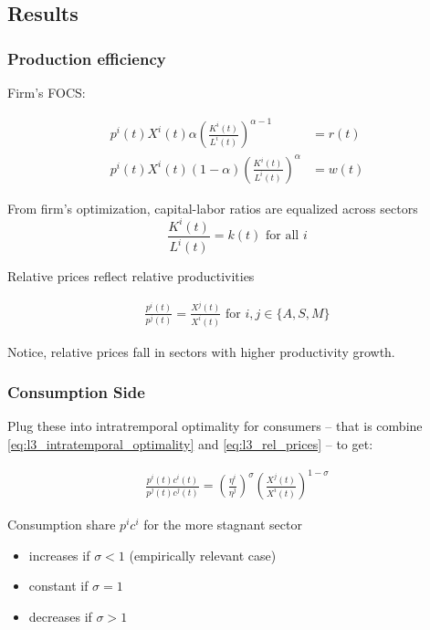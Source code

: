 \documentclass[10pt]{article}
\begin{document}

\subsection{Results}

\subsubsection{Production efficiency}

Firm's FOCS:

\begin{align} 
    p^i(t) X^i(t) \alpha\left(\frac{K^i(t)}{L^i(t)}\right)^{\alpha-1} & =r(t) \\ 
    p^i(t) X^i(t)(1-\alpha)\left(\frac{K^i(t)}{L^i(t)}\right)^\alpha & =w(t)
\end{align}

From firm's optimization, capital-labor ratios are equalized across sectors
$$
\frac{K^i(t)}{L^i(t)}=k(t) \text { for all } i
$$

Relative prices reflect relative productivities

\begin{align}
    \frac{p^i(t)}{p^j(t)}=\frac{X^j(t)}{X^i(t)} \text { for } i, j \in\{A, S, M\} \label{eq:l3_rel_prices}
\end{align}

Notice, relative prices fall in sectors with higher productivity growth.


\subsubsection{Consumption Side}

Plug these into intratremporal optimality for consumers -- 
that is combine \eqref{eq:l3_intratemporal_optimality} and \eqref{eq:l3_rel_prices} --
to get:

\begin{align}
    \frac{p^i(t) c^i(t)}{p^j(t) c^j(t)}=\left(\frac{\eta^i}{\eta^j}\right)^\sigma\left(\frac{X^j(t)}{X^i(t)}\right)^{1-\sigma} \label{eq:l3_rel_lab_tech}
\end{align}


Consumption share $p^i c^i$ for the more stagnant sector

\begin{itemize}
    \item increases if $\sigma<1$ (empirically relevant case)
    \item constant if $\sigma=1$
    \item decreases if $\sigma>1$
\end{itemize}
\end{document}
